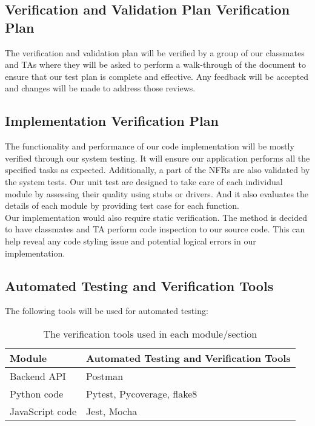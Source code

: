 \documentclass[12pt, titlepage]{article}
\begin{document}
\subsection{Verification and Validation Plan Verification Plan}

\noindent
The verification and validation plan will be verified by a group of our classmates and TAs where they will be asked to perform a walk-through of the document to ensure that our test plan is complete and effective. Any feedback will be accepted and changes will be made to address those reviews.

\subsection{Implementation Verification Plan}

  
The functionality and performance of our code implementation will be mostly verified through our system testing. It will ensure our application performs all the specified tasks as expected. Additionally, a part of the NFRs are also validated by the system tests. Our unit test are designed to take care of each individual module by assessing their quality using stubs or drivers. And it also evaluates the details of each module by providing test case for each function.\\
\noindent
Our implementation would also require static verification. The method is decided to have classmates and TA perform code inspection to our source code. This can help reveal any code styling issue and potential logical errors in our implementation.

\subsection{Automated Testing and Verification Tools}

The following tools will be used for automated testing:

\begin{table}[!h]
    \centering
    \begin{tabular}{l|l}
    \hline
        \textbf{Module} & \textbf{Automated Testing and Verification Tools} \\ \hline
        Backend API & Postman \\ \hline
        Python code & Pytest, Pycoverage, flake8 \\ \hline
        JavaScript code & Jest, Mocha \\ \hline
    \end{tabular}
    \caption{The verification tools used in each module/section}
\end{table}
\end{document}
